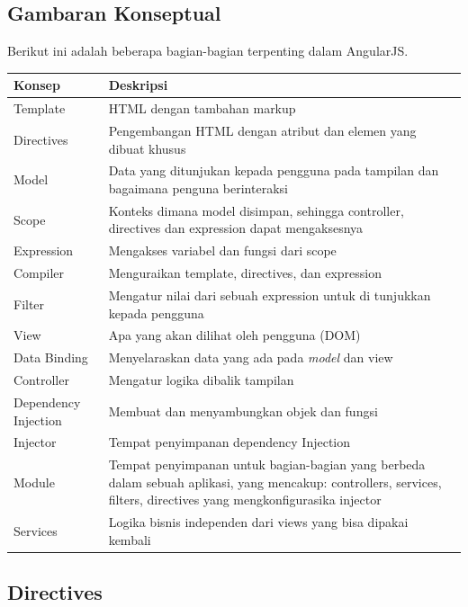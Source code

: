 \subsection{Gambaran Konseptual}
\label{sub: gambaranKonsep}
	Berikut ini adalah beberapa bagian-bagian terpenting dalam AngularJS.
	\begin{center}
		\begin{tabular}{| m{5cm} | m{10cm} |}
			\hline
			Konsep & Deskripsi \\
			\hline
			Template & HTML dengan tambahan markup \\
			\hline
			Directives & Pengembangan HTML dengan atribut dan elemen yang dibuat khusus \\
			\hline
			Model & Data yang ditunjukan kepada pengguna pada tampilan dan bagaimana penguna berinteraksi \\
			\hline
			Scope & Konteks dimana model disimpan, sehingga controller, directives dan expression dapat mengaksesnya \\
			\hline
			Expression & Mengakses variabel dan fungsi dari scope \\
			\hline
			Compiler & Menguraikan template, directives, dan expression \\
			\hline
			Filter & Mengatur nilai dari sebuah expression untuk di tunjukkan kepada pengguna \\
			\hline
			View & Apa yang akan dilihat oleh pengguna (DOM) \\
			\hline
			Data Binding & Menyelaraskan data yang ada pada \textit{model} dan view \\
			\hline
			Controller & Mengatur logika dibalik tampilan \\
			\hline
			Dependency Injection & Membuat dan menyambungkan objek dan fungsi \\
			\hline
			Injector & Tempat penyimpanan dependency Injection \\
			\hline
			Module & Tempat penyimpanan untuk bagian-bagian yang berbeda dalam sebuah aplikasi, yang mencakup: controllers, services, filters, directives yang mengkonfigurasika injector \\
			\hline
			Services & Logika bisnis independen dari views yang bisa dipakai kembali  \\
			\hline
			\end{tabular}
		\end{center}
		
\subsection{Directives}
\label{sub: directives}


